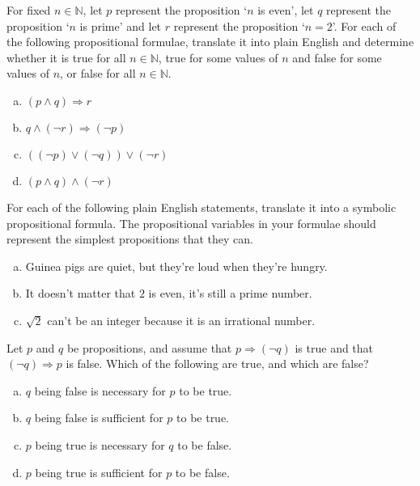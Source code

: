 \begin{chapex}
\label{cqTranslatePropositionalFormulaeToEnglish}
For fixed $n \in \mathbb{N}$, let $p$ represent the proposition `$n$ is even', let $q$ represent the proposition `$n$ is prime' and let $r$ represent the proposition `$n = 2$'. For each of the following propositional formulae, translate it into plain English and determine whether it is true for all $n \in \mathbb{N}$, true for some values of $n$ and false for some values of $n$, or false for all $n \in \mathbb{N}$.

\begin{enumerate}[(a)]
\item $(p \wedge q) \Rightarrow r$
\item $q \wedge (\neg r) \Rightarrow (\neg p)$
\item $((\neg p) \vee (\neg q)) \vee (\neg r)$
\item $(p \wedge q) \wedge (\neg r)$
\end{enumerate}
\end{chapex}

\begin{chapex}
For each of the following plain English statements, translate it into a symbolic propositional formula. The propositional variables in your formulae should represent the simplest propositions that they can.
\begin{enumerate}[(a)]
\item Guinea pigs are quiet, but they're loud when they're hungry.
\item It doesn't matter that $2$ is even, it's still a prime number.
\item $\sqrt{2}$ can't be an integer because it is an irrational number.
\end{enumerate}
\end{chapex}

\begin{chapex}
Let $p$ and $q$ be propositions, and assume that $p \Rightarrow (\neg q)$ is true and that $(\neg q) \Rightarrow p$ is false. Which of the following are true, and which are false?
\begin{enumerate}[(a)]
\item $q$ being false is necessary for $p$ to be true.
\item $q$ being false is sufficient for $p$ to be true.
\item $p$ being true is necessary for $q$ to be false.
\item $p$ being true is sufficient for $p$ to be false.
\end{enumerate}
\end{chapex}

